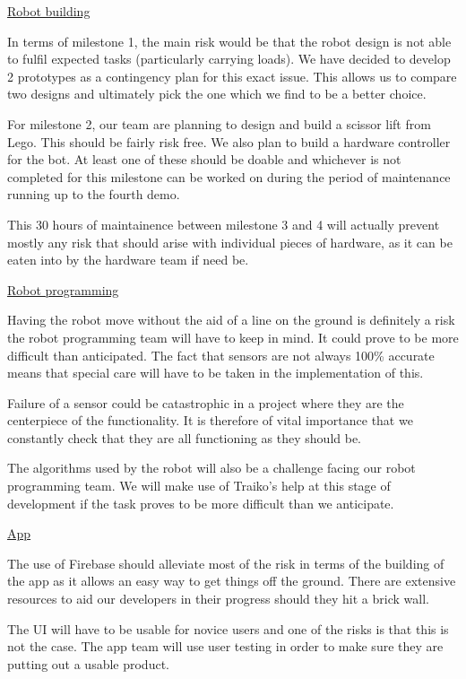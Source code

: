 \documentclass{article}
\begin{document}
\underline{Robot building}

In terms of milestone 1, the main risk would be that the robot design is not able to fulfil expected tasks (particularly carrying loads). We have decided to develop 2 prototypes as a contingency plan for this exact issue. This allows us to compare two designs and ultimately pick the one which we find to be a better choice.

For milestone 2, our team are planning to design and build a scissor lift from Lego. This should be fairly risk free. We also plan to build a hardware controller for the bot. At least one of these should be doable and whichever is not completed for this milestone can be worked on during the period of maintenance running up to the fourth demo.

This 30 hours of maintainence between milestone 3 and 4 will actually prevent mostly any risk that should arise with individual pieces of hardware, as it can be eaten into by the hardware team if need be.

\underline{Robot programming}

Having the robot move without the aid of a line on the ground is definitely a risk the robot programming team will have to keep in mind. It could prove to be more difficult than anticipated. The fact that sensors are not always 100\% accurate means that special care will have to be taken in the implementation of this.

Failure of a sensor could be catastrophic in a project where they are the centerpiece of the functionality. It is therefore of vital importance that we constantly check that they are all functioning as they should be.

The algorithms used by the robot will also be a challenge facing our robot programming team. We will make use of Traiko's help at this stage of development if the task proves to be more difficult than we anticipate.

\underline{App}

The use of Firebase should alleviate most of the risk in terms of the building of the app as it allows an easy way to get things off the ground. There are extensive resources to aid our developers in their progress should they hit a brick wall.

The UI will have to be usable for novice users and one of the risks is that this is not the case. The app team will use user testing in order to make sure they are putting out a usable product.
\end{document}
